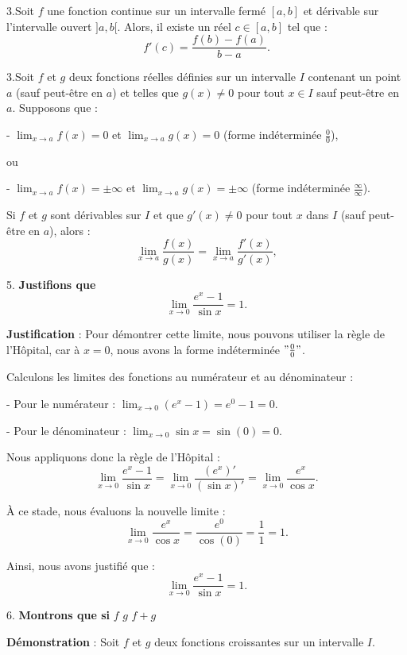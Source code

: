 \documentclass[12pt]{article}
\begin{document}
3.Soit \( f \) une fonction continue sur un intervalle fermé \([a, b]\) et dérivable sur l'intervalle ouvert \( ]a, b[ \). Alors, il existe un réel \( c \in [a, b] \) tel que :
\[
f'(c) = \frac{f(b) - f(a)}{b - a}.
\]

3.Soit \( f \) et \( g \) deux fonctions réelles définies sur un intervalle \( I \) contenant un point \( a \) (sauf peut-être en \( a \)) et telles que \( g(x) \neq 0 \) pour tout \( x \in I \) sauf peut-être en \( a \). Supposons que :

- \( \lim_{x \to a} f(x) = 0 \) et \( \lim_{x \to a} g(x) = 0 \) (forme indéterminée \( \frac{0}{0} \)), 

ou

- \( \lim_{x \to a} f(x) = \pm \infty \) et \( \lim_{x \to a} g(x) = \pm \infty \) (forme indéterminée \( \frac{\infty}{\infty} \)).

Si \( f \) et \( g \) sont dérivables sur \( I \) et que \( g'(x) \neq 0 \) pour tout \( x \) dans \( I \) (sauf peut-être en \( a \)), alors :
\[
\lim_{x \to a} \frac{f(x)}{g(x)} = \lim_{x \to a} \frac{f'(x)}{g'(x)},
\]

5. \textbf{Justifions que}
\[
\lim_{x \to 0} \frac{e^{x}-1}{\sin x} = 1.
\]

\textbf{Justification} : Pour démontrer cette limite, nous pouvons utiliser la règle de l'Hôpital, car à \( x = 0 \), nous avons la forme indéterminée \( "\frac{0}{0}" \).

Calculons les limites des fonctions au numérateur et au dénominateur :

- Pour le numérateur : \( \lim_{x \to 0} (e^{x} - 1) = e^{0} - 1 = 0 \).

- Pour le dénominateur : \( \lim_{x \to 0} \sin x = \sin(0) = 0 \).

Nous appliquons donc la règle de l'Hôpital :
\[
\lim_{x \to 0} \frac{e^{x}-1}{\sin x} = \lim_{x \to 0} \frac{(e^{x})'}{(\sin x)'} = \lim_{x \to 0} \frac{e^{x}}{\cos x}.
\]

À ce stade, nous évaluons la nouvelle limite :
\[
\lim_{x \to 0} \frac{e^{x}}{\cos x} = \frac{e^{0}}{\cos(0)} = \frac{1}{1} = 1.
\]

Ainsi, nous avons justifié que :
\[
\lim_{x \to 0} \frac{e^{x}-1}{\sin x} = 1.
\]

6. \textbf{Montrons que si } \( f \)  \( g \)  \( f + g \)\\ 

\textbf{Démonstration} : Soit \( f \) et \( g \) deux fonctions croissantes sur un intervalle \( I \).
\end{document}
